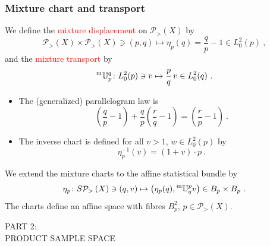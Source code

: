 \documentclass[xcolor=svgnames]{beamer}
\newcommand{\Bspaceat}[1]{L^2_0(#1)}
\newcommand{\mtransport}[2]{\prescript{\text{m}}{} {\mathbb U} _ {#1} ^ {#2}}
\newcommand{\opensimplexon}[1]{\mathcal P_>\left(#1\right)}
\newcommand{\rosso}[1]{\textcolor{red}{#1}}
\renewcommand{\emph}{\rosso}
\begin{document}
\begin{frame}\small\frametitle{Mixture chart and transport}
\begin{block}{}
      We define the \emph{mixture displacement} on $\opensimplexon X$ by
       \begin{equation*}
      \opensimplexon X \times \opensimplexon X \ni (p,q) \mapsto \eta_p(q) = \frac q p - 1 \in \Bspaceat p \ ,
    \end{equation*}
    and the \emph{mixture transport} by
    \begin{equation*}
      \mtransport p q \colon \Bspaceat p \ni v \mapsto \frac p q \, v \in \Bspaceat q \ .
    \end{equation*}
\end{block}

\begin{itemize}  
\item The (generalized) parallelogram law is
  \begin{equation*}
 \left(\frac q p -1\right) + \frac q p \left(\frac r q -1\right) = \left(\frac r p -1\right) \ .
\end{equation*}
\item The inverse chart is defined for all $v > 1$, $w \in \Bspaceat p$ by
  \begin{equation*}
    \eta^{-1}_p(v) =  (1+v) \cdot p \ .
  \end{equation*}
\end{itemize} 

\begin{block}{} We extend the mixture charts to the affine statistical bundle by
    \begin{equation*}
\eta_p \colon S\opensimplexon X \ni (q,v) \mapsto \left(\eta_p(q), \mtransport q p v \right) \in B_p \times B_p \ .        
    \end{equation*}
    The charts define an affine space with fibres $B_p^2$, $p \in \opensimplexon X$.
\end{block}

\end{frame}

\begin{frame}

    \huge PART 2: \\
    PRODUCT SAMPLE SPACE
    
\end{frame}
\end{document}
